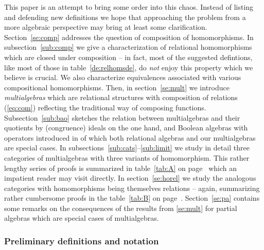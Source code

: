 \documentclass[10pt]{article}
\begin{document}
This paper is an attempt to bring some order into this
chaos. 
Instead of listing and defending new definitions
we hope that approaching the problem from a more algebraic perspective
may bring at least some clarification. 
Section~\ref{se:comp}
addresses the question of composition of homomorphisms.  In
subsection~\ref{sub:comp} we give a characterization of relational
homomorphisms which are closed under composition -- in fact, most of
the suggested defintions, like most of those in
table~\ref{de:relhomsde}, do {\em not} enjoy this property which we
believe is crucial.  We also characterize equivalences associated with
various compositional homomorphisms. 
Then, in section~\ref{se:mult} we introduce {\em
multialgebras} which are relational structures with composition of
relations (\ref{eq:com}) reflecting the traditional way of
composing functions.  Subsection~\ref{sub:bao} sketches the relation
between multialgebras and their quotients by (congruence) ideals on the one
hand, and Boolean
algebras with operators introduced in \cite{JT1} of which both
relational algebras \cite{JT2} and our multialgebras are special
cases.  In subsections~\ref{sub:cats}--\ref{sub:limit} we study in
detail three categories of multialgebras with three variants of
homomorphism. This rather lengthy series of proofs is summarized in
table~\ref{tab:A} on page~\pageref{tab:A} which an impatient reader
may visit directly.  In section~\ref{se:horel} we study the analogous
categories with homomorphisms being themselves relations -- again,
summarizing rather cumbersome proofs in the table~\ref{tab:B} on
page~\pageref{tab:B}.  Section~\ref{se:pa} contains some remarks on
the consequences of the results from \ref{se:mult} for partial
algebras which are special cases of multialgebras.

\subsubsection*{Preliminary definitions and notation}
\end{document}
